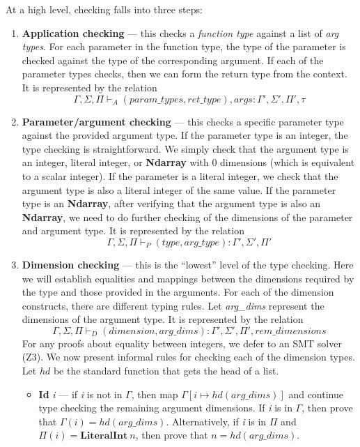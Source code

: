\documentclass[12pt]{report}
\begin{document}
At a high level, checking falls into three steps:
\begin{enumerate}[label=\arabic*.]
    \item \textbf{Application checking} --- this checks a \textit{function type} against a list of \textit{arg types}. For each parameter in the function type, the type of the parameter is checked against the type of the corresponding argument. If each of the parameter types checks, then we can form the return type from the context. It is represented by the relation
    \[\Gamma, \Sigma, \Pi \vdash_{A} (param\_types, ret\_type), args : \Gamma', \Sigma', \Pi', \tau\]

    \item \textbf{Parameter/argument checking} --- this checks a specific parameter type against the provided argument type. If the parameter type is an integer, the type checking is straightforward. We simply check that the argument type is an integer, literal integer, or \textbf{Ndarray} with 0 dimensions (which is equivalent to a scalar integer). If the parameter is a literal integer, we check that the argument type is also a literal integer of the same value. If the parameter type is an \textbf{Ndarray}, after verifying that the argument type is also an \textbf{Ndarray}, we need to do further checking of the dimensions of the parameter and argument type. It is represented by the relation
    $$\Gamma, \Sigma, \Pi \vdash_{P} (type, arg\_type) : \Gamma', \Sigma', \Pi'$$


    \item \textbf{Dimension checking} --- this is the ``lowest'' level of the type checking. Here we will establish equalities and mappings between the dimensions required by the type and those provided in the arguments. For each of the dimension constructs, there are different typing rules. Let \textit{arg\_dims} represent the dimensions of the argument type. It is represented by the relation
    $$\Gamma, \Sigma, \Pi \vdash_{D} (dimension, arg\_dims) : \Gamma', \Sigma', \Pi', rem\_dimensions$$
    For any proofs about equality between integers, we defer to an SMT solver (Z3). We now present informal rules for checking each of the dimension types. Let $hd$ be the standard function that gets the head of a list.

    \begin{itemize}
        \item \textbf{Id} \textit{i} --- if \textit{i} is not in $\Gamma$, then map $\Gamma[i \mapsto hd(arg\_dims)]$ and continue type checking the remaining argument dimensions. If \textit{i} is in $\Gamma$, then prove that $\Gamma(i) = hd(arg\_dims)$. Alternatively, if \textit{i} is in $\Pi$ and $\Pi(i) = \textbf{LiteralInt}~n$, then prove that $n = hd(arg\_dims)$.


\end{itemize}
\end{enumerate}
\end{document}
